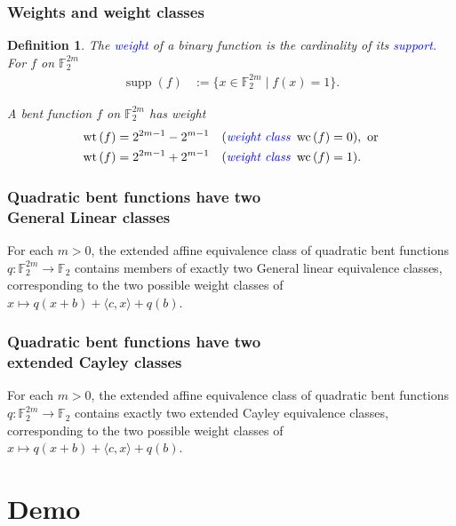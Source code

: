 \documentclass[pdf,sprung,slideColor,nocolorBG]{beamer}
\newenvironment{colortheme}[1]{
\def\ProvidesPackageRCS $##1${\relax}
\renewcommand{\ProcessOptions}{\relax}
\makeatletter

\makeatother
}{}
\newcommand{\mb}[1]{\mathbb{#1}}
\newcommand{\Emph}[1]{\emph{\textcolor{blue}{#1}}}
\newcommand{\To}{\rightarrow}
\newcommand{\Cay}[1]{\operatorname{Cay}\left(#1\right)}
\newcommand{\support}[1]{\operatorname{supp}\left(#1\right)}
\newcommand{\weight}[1]{\operatorname{wt}\left(#1\right)}
\newcommand{\weightclass}[1]{\operatorname{wc}\left(#1\right)}
\newcommand{\F}{\mb{F}}
\newtheorem{Def}{Definition}
\begin{document}
\begin{colortheme}{access}
\begin{frame}
\frametitle{Weights and weight classes}
\begin{Def}
The \Emph{weight} of a binary function is the cardinality of its \Emph{support}.
For $f$ on $\F_2^{2m}$
\begin{align*}
\support{f} &:= \{x \in \F_2^{2m} \mid f(x)=1 \}.
\end{align*}

A bent function $f$ on $\F_2^{2m}$ has weight
\begin{align*}
\weight{f} &= 2^{2 m - 1} - 2^{m-1} \quad (\text{\Emph{weight class~}} \weightclass{f}=0), \text{~or}
\\
\weight{f} &= 2^{2 m - 1} + 2^{m-1} \quad (\text{\Emph{weight class~}} \weightclass{f}=1).
\end{align*}
\end{Def}
\end{frame}

\begin{frame}
\frametitle{Quadratic bent functions have two \\ General Linear classes}
\begin{Theorem}
For each $m>0$, the extended affine equivalence class of quadratic bent functions
$q : \F_2^{2m} \To \F_2$ contains members of exactly two General linear equivalence classes,
corresponding to the two possible weight classes of $x \mapsto q(x+b) + \langle c, x \rangle + q(b)$.
\end{Theorem}

\end{frame}

\begin{frame}
\frametitle{Quadratic bent functions have two \\ extended Cayley classes}
\begin{Corollary}
For each $m>0$, the extended affine equivalence class of quadratic bent functions
$q : \F_2^{2m} \To \F_2$ contains exactly two extended Cayley equivalence classes,
corresponding to the two possible weight classes of $x \mapsto q(x+b) + \langle c, x \rangle + q(b)$.
\end{Corollary}

\end{frame}

\end{colortheme}

\section{Demo}
\end{document}
